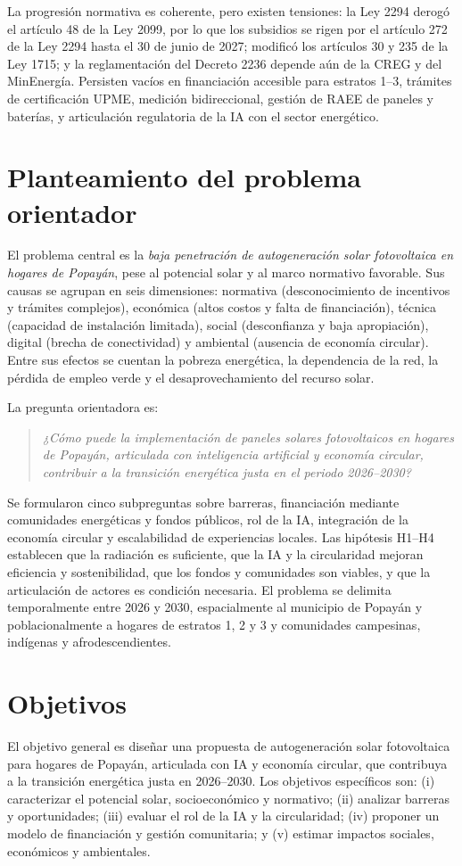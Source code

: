 \documentclass[journal]{IEEEtran}
\begin{document}
La progresión normativa es coherente, pero existen tensiones: la Ley 2294 derogó el artículo 48 de la Ley 2099, por lo que los subsidios se rigen por el artículo 272 de la Ley 2294 hasta el 30 de junio de 2027; modificó los artículos 30 y 235 de la Ley 1715; y la reglamentación del Decreto 2236 depende aún de la CREG y del MinEnergía. Persisten vacíos en financiación accesible para estratos 1--3, trámites de certificación UPME, medición bidireccional, gestión de RAEE de paneles y baterías, y articulación regulatoria de la IA con el sector energético.

\section{Planteamiento del problema orientador}
El problema central es la \emph{baja penetración de autogeneración solar fotovoltaica en hogares de Popayán}, pese al potencial solar y al marco normativo favorable. Sus causas se agrupan en seis dimensiones: normativa (desconocimiento de incentivos y trámites complejos), económica (altos costos y falta de financiación), técnica (capacidad de instalación limitada), social (desconfianza y baja apropiación), digital (brecha de conectividad) y ambiental (ausencia de economía circular). Entre sus efectos se cuentan la pobreza energética, la dependencia de la red, la pérdida de empleo verde y el desaprovechamiento del recurso solar.

La pregunta orientadora es:
\begin{quote}
\emph{¿Cómo puede la implementación de paneles solares fotovoltaicos en hogares de Popayán, articulada con inteligencia artificial y economía circular, contribuir a la transición energética justa en el periodo 2026--2030?}
\end{quote}

Se formularon cinco subpreguntas sobre barreras, financiación mediante comunidades energéticas y fondos públicos, rol de la IA, integración de la economía circular y escalabilidad de experiencias locales. Las hipótesis H1--H4 establecen que la radiación es suficiente, que la IA y la circularidad mejoran eficiencia y sostenibilidad, que los fondos y comunidades son viables, y que la articulación de actores es condición necesaria. El problema se delimita temporalmente entre 2026 y 2030, espacialmente al municipio de Popayán y poblacionalmente a hogares de estratos 1, 2 y 3 y comunidades campesinas, indígenas y afrodescendientes.

\section{Objetivos}
El objetivo general es diseñar una propuesta de autogeneración solar fotovoltaica para hogares de Popayán, articulada con IA y economía circular, que contribuya a la transición energética justa en 2026--2030. Los objetivos específicos son: (i) caracterizar el potencial solar, socioeconómico y normativo; (ii) analizar barreras y oportunidades; (iii) evaluar el rol de la IA y la circularidad; (iv) proponer un modelo de financiación y gestión comunitaria; y (v) estimar impactos sociales, económicos y ambientales.
\end{document}
